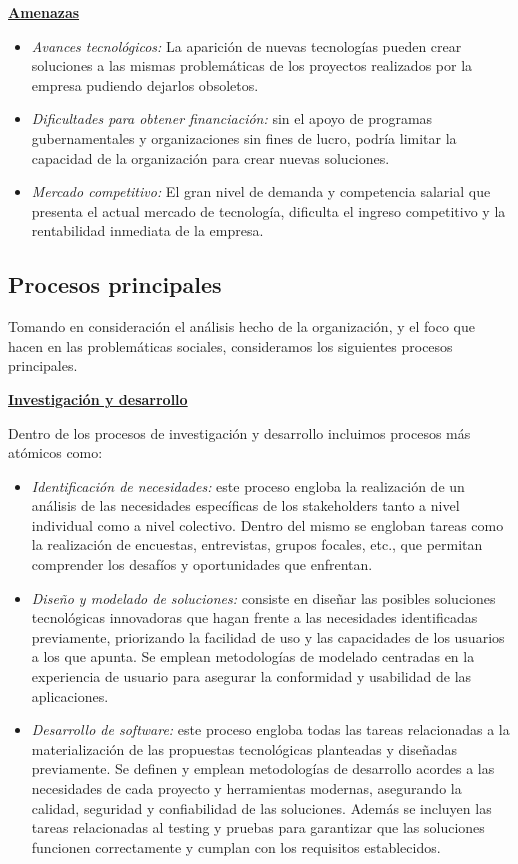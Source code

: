 \documentclass[a4paper,12pt]{article}
\begin{document}
    \newpage
    \textbf{\underline{Amenazas}}
    \begin{itemize}
        \item[] \textit{Avances tecnológicos:} La aparición de nuevas tecnologías pueden crear soluciones a las mismas problemáticas de los proyectos realizados por la empresa pudiendo dejarlos obsoletos.
        \item[] \textit{Dificultades para obtener financiación:} sin el apoyo de programas gubernamentales y organizaciones sin fines de lucro, podría limitar la capacidad de la organización para crear nuevas soluciones.
        \item[] \textit{Mercado competitivo:} El gran nivel de demanda y competencia salarial que presenta el actual mercado de tecnología, dificulta el ingreso competitivo y la rentabilidad inmediata de la empresa.
    \end{itemize}
    \subsection{Procesos principales}
    Tomando en consideración el análisis hecho de la organización, y el foco que hacen en las problemáticas sociales, consideramos los siguientes procesos principales.

    \noindent \textbf{\underline{Investigación y desarrollo}}

    Dentro de los procesos de investigación y desarrollo incluimos procesos más atómicos como:
    \begin{itemize}
        \item[] \textit{Identificación de necesidades:} este proceso engloba la realización de un análisis de las necesidades específicas de los stakeholders tanto a nivel individual como a nivel colectivo. Dentro del mismo se engloban tareas como la realización de encuestas, entrevistas, grupos focales, etc., que permitan comprender los desafíos y oportunidades que enfrentan.
        \item[] \textit{Diseño y modelado de soluciones:} consiste en diseñar las posibles soluciones tecnológicas innovadoras que hagan frente a las necesidades identificadas previamente, priorizando la facilidad de uso y las capacidades de los usuarios a los que apunta. Se emplean metodologías de modelado centradas en la experiencia de usuario para asegurar la conformidad y usabilidad de las aplicaciones.
        \item[] \textit{Desarrollo de software:} este proceso engloba todas las tareas relacionadas a la materialización de las propuestas tecnológicas planteadas y diseñadas previamente. Se definen y emplean metodologías de desarrollo acordes a las necesidades de cada proyecto y herramientas modernas, asegurando la calidad, seguridad y confiabilidad de las soluciones. Además se incluyen las tareas relacionadas al testing y pruebas para garantizar que las soluciones funcionen correctamente y cumplan con los requisitos establecidos.
    \end{itemize}
\end{document}
